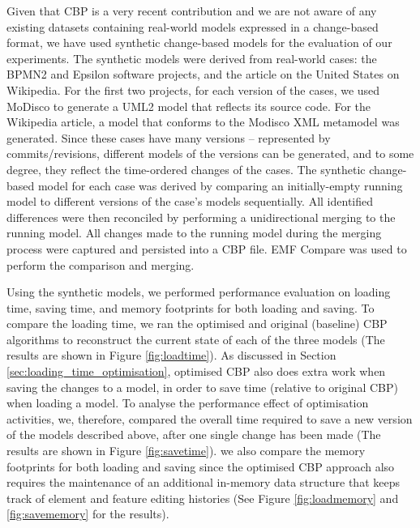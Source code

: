 \documentclass{llncs}
\begin{document}
{    Given that CBP is a very recent contribution and we are not aware of any existing datasets containing real-world models expressed in a change-based format, we have used synthetic change-based models for the evaluation of our experiments. The synthetic models were derived from real-world cases: the BPMN2 \cite{eclipse2017bpmn2,eclipse2018bpmn2git} and Epsilon \cite{eclipse2017epsilon,eclipse2018epsilongit} software projects, and the article on the United States \cite{wikipedia2018us} on Wikipedia. For the first two projects, for each version of the cases, we used MoDisco \cite{DBLP:journals/infsof/BruneliereCDM14} to generate a UML2 \cite{eclipse2017uml2} model that reflects its source code. For the Wikipedia article, a model that conforms to the Modisco XML metamodel \cite{eclipse2018modiscoxml} was generated. Since these cases have many versions -- represented by commits/revisions, different models of the versions can be generated, and to some degree, they reflect the time-ordered changes of the cases. The synthetic change-based model for each case was derived by comparing an initially-empty running model to different versions of the case's models sequentially. All identified differences were then reconciled by performing a unidirectional merging to the running model. All changes made to the running model during the merging process were captured and persisted into a CBP file. EMF Compare was used \cite{eclipse2017compare} to perform the comparison and merging.
    
    Using the synthetic models, we performed performance evaluation on loading time, saving time, and memory footprints for both loading and saving. To compare the loading time, we ran the optimised and original (baseline) CBP algorithms to reconstruct the current state of each of the three models (The results are shown in Figure \ref{fig:loadtime}). As discussed in Section \ref{sec:loading_time_optimisation}, optimised CBP also does extra work when saving the changes to a model, in order to save time (relative to original CBP) when loading a model. To analyse the performance effect of optimisation activities, we, therefore, compared the overall time required to save a new version of the models described above, after one single change has been made (The results are shown in Figure \ref{fig:savetime}). we also compare the memory footprints for both loading and saving since the optimised CBP approach also requires the maintenance of an additional in-memory data structure that keeps track of element and feature editing histories (See Figure \ref{fig:loadmemory} and \ref{fig:savememory} for the results). 
    
}
\end{document}
